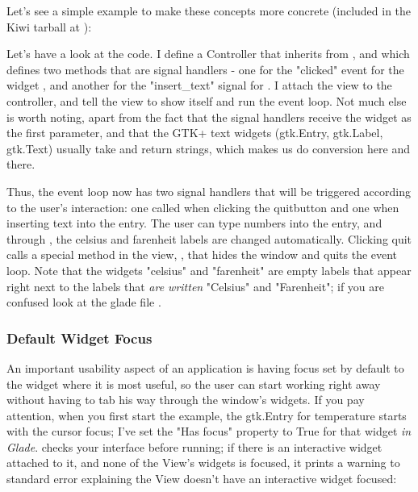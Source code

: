 \documentclass[a4paper]{howto}
\begin{document}
Let's see a simple example to make
these concepts more concrete (included in the Kiwi tarball at
):




Let's have a look at the code. I define a Controller
 that inherits from , and
which defines two methods that are signal handlers - one for the
"clicked" event for the widget , and another for the
"insert\_text" signal for . I attach the view to the
controller, and tell the view to show itself and run the event loop. Not
much else is worth noting, apart from the fact that the signal handlers
receive the widget as the first parameter, and that the GTK+ text
widgets (gtk.Entry, gtk.Label, gtk.Text) usually take and return strings,
which makes us do conversion here and there.

Thus, the event loop now has two signal handlers that will be triggered
according to the user's interaction: one called when clicking the
quitbutton and one when inserting text into the entry. The user can type
numbers into the entry, and through
, the celsius and farenheit
labels are changed automatically. Clicking quit calls a special method
in the view, , that hides the window and quits
the event loop. Note that the widgets "celsius" and "farenheit" are
empty labels that appear right next to the labels that {\it are written}
"Celsius" and "Farenheit"; if you are confused look at the glade file
.

\subsubsection{Default Widget Focus}

An important usability aspect of an application is having focus set by
default to the widget where it is most useful, so the user can start
working right away without having to tab his way through the window's
widgets. If you pay attention, when you first start the 
example, the gtk.Entry for temperature starts with the cursor focus; I've
set the "Has focus" property to True for that widget {\it in Glade}.
 checks your interface before running; if there
is an interactive widget attached to it, and none of the View's widgets
is focused, it prints a warning to standard error explaining the View
doesn't have an interactive widget focused:
\end{document}
